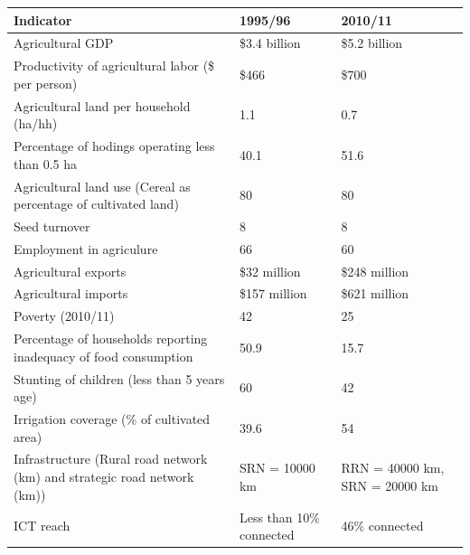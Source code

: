 \documentclass[
  openany]{book}
\begin{document}
\begin{table}[H]
\centering\begingroup\fontsize{10}{12}\selectfont

\begin{tabular}{>{\raggedright\arraybackslash}p{12em}ll}
\toprule
Indicator & 1995/96 & 2010/11\\
\midrule
\rowcolor{gray!6}  Agricultural GDP & \$3.4 billion & \$5.2 billion\\
Productivity of agricultural labor (\$ per person) & \$466 & \$700\\
\rowcolor{gray!6}  Agricultural land per household (ha/hh) & 1.1 & 0.7\\
Percentage of hodings operating less than 0.5 ha & 40.1 & 51.6\\
\rowcolor{gray!6}  Agricultural land use (Cereal as percentage of cultivated land) & 80 & 80\\
\addlinespace
Seed turnover & 8 & 8\\
\rowcolor{gray!6}  Employment in agriculure & 66 & 60\\
Agricultural exports & \$32 million & \$248 million\\
\rowcolor{gray!6}  Agricultural imports & \$157 million & \$621 million\\
Poverty (2010/11) & 42 & 25\\
\addlinespace
\rowcolor{gray!6}  Percentage of households reporting inadequacy of food consumption & 50.9 & 15.7\\
Stunting of children (less than 5 years age) & 60 & 42\\
\rowcolor{gray!6}  Irrigation coverage (\% of cultivated area) & 39.6 & 54\\
Infrastructure (Rural road network (km) and strategic road network (km)) & SRN = 10000 km & RRN = 40000 km, SRN = 20000 km\\
\rowcolor{gray!6}  ICT reach & Less than 10\% connected & 46\% connected\\
\bottomrule
\end{tabular}
\endgroup{}
\end{table}
\end{document}
